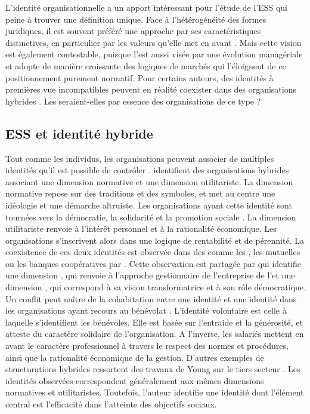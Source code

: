        L'identité organisationnelle a un apport intéressant pour l'étude de l'ESS qui peine à trouver une définition unique. Face à l'hétérogénéité des formes juridiques, il est souvent préféré une approche par ses caractéristiques distinctives, en particulier par les valeurs qu'elle met en avant \parencite{chedotel2004ambivalence}. Mais cette vision est également contestable, puisque l'\ess est aussi visée par une évolution managériale et adopte de manière croissante des logiques de marchés qui l'éloignent de ce positionnement purement normatif. Pour certains auteurs, des identités à premières vue incompatibles peuvent en réalité coexister dans des organisations hybrides \parencite{chedotel2012linfluence, mariaux2018leconomie, foreman2002members}. Les \eess seraient-elles par essence des organisations de ce type ?


    \subsection{ESS et identité hybride}

        Tout comme les individus, les organisations peuvent associer de multiples identités qu'il est possible de contrôler \parencite{pratt2000classifying}. \textcite{foreman2002members} identifient des organisations hybrides associant une dimension normative et une dimension utilitariste. La dimension normative repose sur des traditions et des symboles, et met au centre une idéologie et une démarche altruiste. Les organisations ayant cette identité sont tournées vers la démocratie, la solidarité et la promotion sociale \parencite[][p.8]{chedotel2012linfluence}. La dimension utilitariste renvoie à l'intérêt personnel et à la rationalité économique. Les organisations s'inscrivent alors dans une logique de rentabilité et de pérennité. La coexistence de ces deux identités est observée dans des \oess comme les \scop, les mutuelles ou les banques coopératives par \textcite{chedotel2012linfluence}. Cette observation est partagée par \textcite{laville2016economie} qui identifie une dimension , qui renvoie à l'approche gestionnaire de l'entreprise de l'\ess et une dimension , qui correspond à sa vision transformatrice et à son rôle démocratique. Un conflit peut naître de la cohabitation entre une identité  et une identité  dans les organisations ayant recours au bénévolat \parencite{kreutzer2011volunteering}. L'identité volontaire est celle à laquelle s'identifient les bénévoles. Elle est basée sur l'entraide et la générosité, et atteste du caractère solidaire de l'organisation. A l'inverse, les salariés mettent en avant le caractère professionnel à travers le respect des normes et procédures, ainsi que la rationalité économique de la gestion. D'autres exemples de structurations hybrides ressortent des travaux de Young sur le tiers secteur \parencite{young2001organizational, young2000alternative}. Les identités observées correspondent généralement aux mêmes dimensions normatives et utilitaristes. Toutefois, l'auteur identifie une identité dont l'élément central est l'efficacité dans l'atteinte des objectifs sociaux. \\

